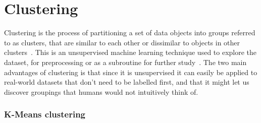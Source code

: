 \section{Clustering}

Clustering is the process of partitioning a set of data objects into groups referred to as clusters, that are similar to each other or dissimilar to objects in other clusters~\cite{datamining}.
This is an unsupervised machine learning technique used to explore the dataset, for preprocessing or as a subroutine for further study~\cite{kshape}. 
The two main advantages of clustering is that since it is unsupervised it can easily be applied to real-world datasets that don't need to be labelled first, 
and that it might let us discover groupings that humans would not intuitively think of. 

\subsubsection{K-Means clustering}

